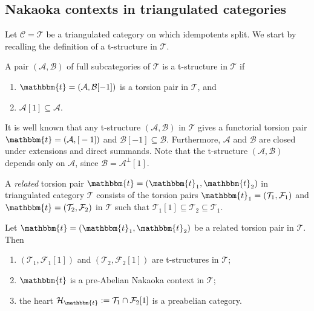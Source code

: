 
\subsection{Nakaoka contexts in triangulated categories}

Let $\mathscr{C}=\mathcal{T}$ be a triangulated category on which idempotents split.
We start by recalling the definition of a t-structure in $\mathcal{T}$.

\begin{definition}
  A pair $(\mathcal{A},\mathcal{B})$ of full subcategories of $\mathcal{T}$ is a t-structure
  in $\mathcal{T}$ if
  \begin{enumerate}[label=(\alph*)]
    \item $\mathbbm{t}=(\mathcal{A},\mathcal{B}[-1])$ is a torsion pair in $\mathcal{T}$, and
    \item $\mathcal{A}[1]\subseteq \mathcal{A}$.
  \end{enumerate}
\end{definition}

\begin{rmk}
  It is well known that any t-structure $(\mathcal{A},\mathcal{B})$ in $\mathcal{T}$
  gives a functorial torsion pair $\mathbbm{t}=(\mathcal{A},\mathcal[-1])$ and
  $\mathcal{B}[-1]\subseteq\mathcal{B}$. Furthermore, $\mathcal{A}$ and
  $\mathcal{B}$ are closed under extensions and direct summands. Note that the t-structure
  $(\mathcal{A},\mathcal{B})$ depends only on $\mathcal{A}$, since $\mathcal{B}=\mathcal{A}^\perp[1]$.
\end{rmk}

\begin{definition}
  A \emph{related} torsion pair $\mathbbm{t}=(\mathbbm{t}_1,\mathbbm{t}_2)$ in triangulated category
  $\mathcal{T}$ consists of the torsion pairs $\mathbbm{t}_1=(\mathcal{T}_1,\mathcal{F}_1)$
  and $\mathbbm{t}=(\mathcal{T}_2,\mathcal{F}_2)$ in $\mathcal{T}$ such that
  $\mathcal{T}_1[1]\subseteq \mathcal{T}_2\subseteq\mathcal{T}_1$.
\end{definition}

\begin{prop}\label{prop:2.5}
  Let $\mathbbm{t}=(\mathbbm{t}_1,\mathbbm{t}_2)$ be a related torsion pair in $\mathcal{T}$. Then
  \begin{enumerate}[label=(\alph*)]
    \item $(\mathcal{T}_1,\mathcal{F}_1[1])$ and $(\mathcal{T}_2,\mathcal{F}_2[1])$
    are t-structures in $\mathcal{T}$;
  \item\label{prop:2.5:b} $\mathbbm{t}$ is a pre-Abelian Nakaoka context in $\mathcal{T}$;
    \item the heart $\mathcal{H}_\mathbbm{t} := \mathcal{T}_1\cap\mathcal{F}_2[1]$ is a preabelian category.
  \end{enumerate}
\end{prop}

